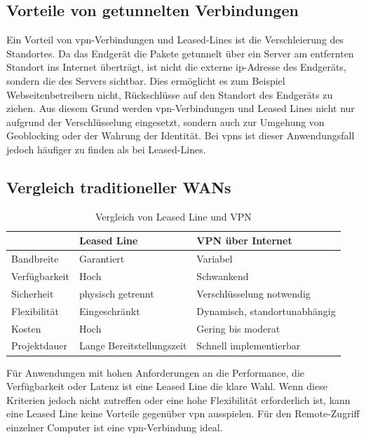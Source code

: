 \subsection*{Vorteile von getunnelten Verbindungen}
Ein Vorteil von \ac{vpn}-Verbindungen und Leased-Lines ist die Verschleierung des Standortes. Da das Endgerät die Pakete getunnelt über ein Server am entfernten Standort ins Internet überträgt, ist nicht die externe \ac{ip}-Adresse des Endgeräts, sondern die des Servers sichtbar. Dies ermöglicht es zum Beispiel Webseitenbetreibern nicht, Rückschlüsse auf den Standort des Endgeräts zu ziehen. Aus diesem Grund werden \ac{vpn}-Verbindungen und Leased Lines nicht nur aufgrund der Verschlüsselung eingesetzt, sondern auch zur Umgehung von Geoblocking oder der Wahrung der Identität. Bei \acp{vpn} ist dieser Anwendungsfall jedoch häufiger zu finden als bei Leased-Lines. \\

\subsection*{Vergleich traditioneller WANs}
\begin{table}[H]
\centering
\begin{tabular*}{\textwidth}{lll}
	\hline
	 & \textbf{Leased Line} & \textbf{VPN über Internet} \\
	\hline
	Bandbreite & Garantiert & Variabel \\
	Verfügbarkeit & Hoch & Schwankend \\
	Sicherheit & physisch getrennt & Verschlüsselung notwendig \\
	Flexibilität & Eingeschränkt & Dynamisch, standortunabhängig \\
	Kosten & Hoch & Gering bis moderat\\
	Projektdauer & Lange Bereitstellungszeit & Schnell implementierbar \\
	\hline
\end{tabular*}
\caption{Vergleich von Leased Line und VPN}
\end{table}

Für Anwendungen mit hohen Anforderungen an die Performance, die Verfügbarkeit oder Latenz ist eine Leased Line die klare Wahl. Wenn diese Kriterien jedoch nicht zutreffen oder eine hohe Flexibilität erforderlich ist, kann eine Leased Line keine Vorteile gegenüber \ac{vpn} ausspielen. Für den Remote-Zugriff einzelner Computer ist eine \ac{vpn}-Verbindung ideal.